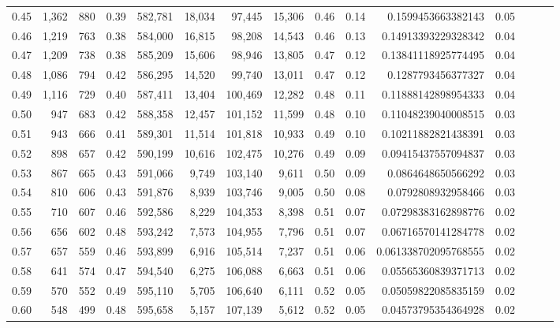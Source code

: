 \begin{tabular}{rrrrrrrrrrrrrrr}
0.45 &   1,362 &    880 &  0.39 &  582,781 &   18,034 &   97,445 &   15,306 &  0.46 &  0.14 &      0.1599453663382143 &      0.05 \\
0.46 &   1,219 &    763 &  0.38 &  584,000 &   16,815 &   98,208 &   14,543 &  0.46 &  0.13 &     0.14913393229328342 &      0.04 \\
0.47 &   1,209 &    738 &  0.38 &  585,209 &   15,606 &   98,946 &   13,805 &  0.47 &  0.12 &     0.13841118925774495 &      0.04 \\
0.48 &   1,086 &    794 &  0.42 &  586,295 &   14,520 &   99,740 &   13,011 &  0.47 &  0.12 &      0.1287793456377327 &      0.04 \\
0.49 &   1,116 &    729 &  0.40 &  587,411 &   13,404 &  100,469 &   12,282 &  0.48 &  0.11 &     0.11888142898954333 &      0.04 \\
0.50 &     947 &    683 &  0.42 &  588,358 &   12,457 &  101,152 &   11,599 &  0.48 &  0.10 &     0.11048239040008515 &      0.03 \\
0.51 &     943 &    666 &  0.41 &  589,301 &   11,514 &  101,818 &   10,933 &  0.49 &  0.10 &     0.10211882821438391 &      0.03 \\
0.52 &     898 &    657 &  0.42 &  590,199 &   10,616 &  102,475 &   10,276 &  0.49 &  0.09 &     0.09415437557094837 &      0.03 \\
0.53 &     867 &    665 &  0.43 &  591,066 &    9,749 &  103,140 &    9,611 &  0.50 &  0.09 &      0.0864648650566292 &      0.03 \\
0.54 &     810 &    606 &  0.43 &  591,876 &    8,939 &  103,746 &    9,005 &  0.50 &  0.08 &      0.0792808932958466 &      0.03 \\
0.55 &     710 &    607 &  0.46 &  592,586 &    8,229 &  104,353 &    8,398 &  0.51 &  0.07 &     0.07298383162898776 &      0.02 \\
0.56 &     656 &    602 &  0.48 &  593,242 &    7,573 &  104,955 &    7,796 &  0.51 &  0.07 &     0.06716570141284778 &      0.02 \\
0.57 &     657 &    559 &  0.46 &  593,899 &    6,916 &  105,514 &    7,237 &  0.51 &  0.06 &    0.061338702095768555 &      0.02 \\
0.58 &     641 &    574 &  0.47 &  594,540 &    6,275 &  106,088 &    6,663 &  0.51 &  0.06 &     0.05565360839371713 &      0.02 \\
0.59 &     570 &    552 &  0.49 &  595,110 &    5,705 &  106,640 &    6,111 &  0.52 &  0.05 &     0.05059822085835159 &      0.02 \\
0.60 &     548 &    499 &  0.48 &  595,658 &    5,157 &  107,139 &    5,612 &  0.52 &  0.05 &     0.04573795354364928 &      0.02 \\

\end{tabular}
